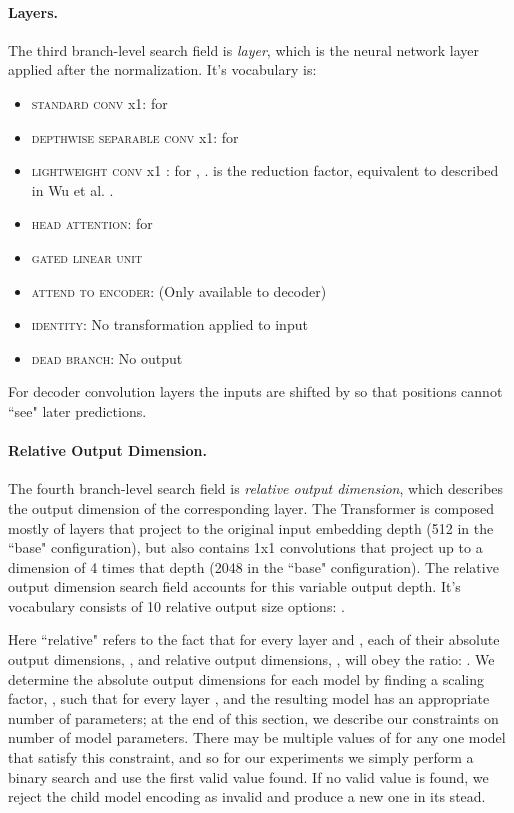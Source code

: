 \documentclass{article}
\begin{document}
\paragraph{Layers.} The third branch-level search field is \textit{layer}, which is the neural network layer applied after the normalization. It's vocabulary is:
\begin{itemize}[noitemsep,nolistsep]
    \item \textsc{standard conv }x1: for 
    \item \textsc{depthwise separable conv }x1: for 
    \item \textsc{lightweight conv }x1 : for ,  \cite{wu2018pay}.  is the reduction factor, equivalent to  described in Wu et al. .
    \item \textsc{ head attention}: for 
    \item \textsc{gated linear unit}\cite{dauphin2017language}
    \item \textsc{attend to encoder}: (Only available to decoder)
    \item \textsc{identity}: No transformation applied to input
    \item \textsc{dead branch}: No output
\end{itemize}


For decoder convolution layers the inputs are shifted by  so that positions cannot ``see" later predictions.


\paragraph{Relative Output Dimension.}
The fourth branch-level search field is \textit{relative output dimension}, which describes the output dimension of the corresponding layer. The Transformer is composed mostly of layers that project to the original input embedding depth (512 in the ``base" configuration), but also contains 1x1 convolutions that project up to a dimension of 4 times that depth (2048 in the ``base" configuration). The relative output dimension search field accounts for this variable output depth. It's vocabulary consists of 10 relative output size options: .

Here ``relative" refers to the fact that for every layer  and , each of their absolute output dimensions, , and relative output dimensions, , will obey the ratio: . We determine the absolute output dimensions for each model by finding a scaling factor, , such that for every layer ,  and the resulting model has an appropriate number of parameters; at the end of this section, we  describe our constraints on number of model parameters. There may be multiple values of  for any one model that satisfy this constraint, and so for our experiments we simply perform a binary search and use the first valid value found. If no valid value is found, we reject the child model encoding as invalid and produce a new one in its stead.
\end{document}
